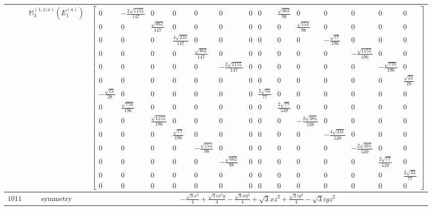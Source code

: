 \documentclass[fleqn,8pt,landscape]{jsarticle}
\begin{document}
\begin{longtable}{ccc}
$  $ & $ \mathbb{M}_{3}^{(1,1;a)}(E_{1}^{(a)}) $ & $ \begin{bmatrix} 0 & - \frac{2 \sqrt{1155}}{147} & 0 & 0 & 0 & 0 & 0 & 0 & \frac{\sqrt{462}}{98} & 0 & 0 & 0 & 0 & 0 \\ 0 & 0 & \frac{\sqrt{462}}{147} & 0 & 0 & 0 & 0 & 0 & 0 & \frac{\sqrt{154}}{98} & 0 & 0 & 0 & 0 \\ 0 & 0 & 0 & \frac{4 \sqrt{231}}{147} & 0 & 0 & 0 & 0 & 0 & 0 & - \frac{\sqrt{77}}{196} & 0 & 0 & 0 \\ 0 & 0 & 0 & 0 & \frac{\sqrt{462}}{147} & 0 & 0 & 0 & 0 & 0 & 0 & - \frac{\sqrt{1155}}{196} & 0 & 0 \\ 0 & 0 & 0 & 0 & 0 & - \frac{2 \sqrt{1155}}{147} & 0 & 0 & 0 & 0 & 0 & 0 & - \frac{\sqrt{770}}{196} & 0 \\ 0 & 0 & 0 & 0 & 0 & 0 & 0 & 0 & 0 & 0 & 0 & 0 & 0 & \frac{\sqrt{22}}{28} \\ - \frac{\sqrt{22}}{28} & 0 & 0 & 0 & 0 & 0 & 0 & \frac{2 \sqrt{33}}{77} & 0 & 0 & 0 & 0 & 0 & 0 \\ 0 & \frac{\sqrt{770}}{196} & 0 & 0 & 0 & 0 & 0 & 0 & \frac{2 \sqrt{77}}{539} & 0 & 0 & 0 & 0 & 0 \\ 0 & 0 & \frac{\sqrt{1155}}{196} & 0 & 0 & 0 & 0 & 0 & 0 & - \frac{2 \sqrt{385}}{539} & 0 & 0 & 0 & 0 \\ 0 & 0 & 0 & \frac{\sqrt{77}}{196} & 0 & 0 & 0 & 0 & 0 & 0 & - \frac{4 \sqrt{231}}{539} & 0 & 0 & 0 \\ 0 & 0 & 0 & 0 & - \frac{\sqrt{154}}{98} & 0 & 0 & 0 & 0 & 0 & 0 & - \frac{2 \sqrt{385}}{539} & 0 & 0 \\ 0 & 0 & 0 & 0 & 0 & - \frac{\sqrt{462}}{98} & 0 & 0 & 0 & 0 & 0 & 0 & \frac{2 \sqrt{77}}{539} & 0 \\ 0 & 0 & 0 & 0 & 0 & 0 & 0 & 0 & 0 & 0 & 0 & 0 & 0 & \frac{2 \sqrt{33}}{77} \\ 0 & 0 & 0 & 0 & 0 & 0 & 0 & 0 & 0 & 0 & 0 & 0 & 0 & 0 \end{bmatrix} $ \\ \hline
$ 1011 $ & $ \text{symmetry} $ & $ - \frac{\sqrt{3} x^{3}}{4} + \frac{\sqrt{3} i x^{2} y}{4} - \frac{\sqrt{3} x y^{2}}{4} + \sqrt{3} x z^{2} + \frac{\sqrt{3} i y^{3}}{4} - \sqrt{3} i y z^{2} $ \\

\end{longtable}
\end{document}
